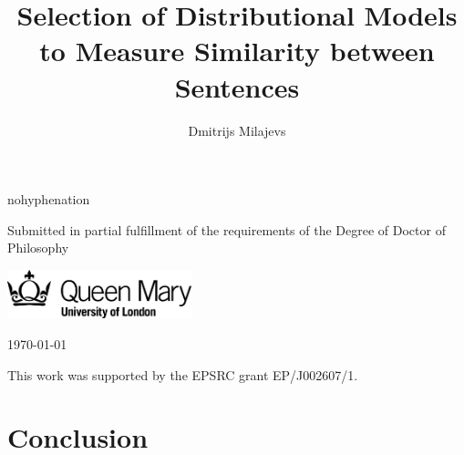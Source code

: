 \documentclass[11pt,a4paper,english,oneside]{book}
\title{Selection of Distributional Models to Measure Similarity between Sentences}
\author{Dmitrijs Milajevs}
\begin{document}
\begin{titlepage}
  \headingfont
    \vspace*{1cm}

    \begin{hyphenrules}{nohyphenation}
      {\Large \thetitle}
    \end{hyphenrules}

    \vspace{1.5cm}

    {\large \theauthor}

    \vfill


    \vspace{0.8cm}

    \begin{center}
     Submitted in partial fulfillment of the requirements of the Degree of Doctor of Philosophy

     \vspace{0.8cm}

     \includegraphics[width=0.4\textwidth]{qmlogo}
      
      \vspace{0.8cm}
      \today
    \end{center}
\end{titlepage}
\addtocounter{page}{1}


\cleardoublepage

\vspace*{\fill}
\begin{center}
  This work was supported by the EPSRC grant EP/J002607/1.
\end{center}
\vfill
\thispagestyle{plain}
\cleardoublepage


\thispagestyle{plain}
\cleardoublepage

{
  \pagestyle{plain}
  \tableofcontents
  \cleardoublepage
  \listoffigures
  \cleardoublepage
  \listoftables
  \thispagestyle{plain}
}








\chapter{Conclusion}
\label{cha:conclusion}
\end{document}
